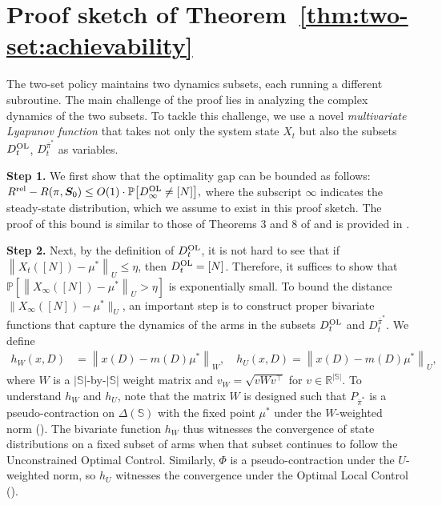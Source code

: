 \documentclass[11pt,letterpaper]{article}
\theoremstyle{plain}
\theoremstyle{definition}
\theoremstyle{remark}
\newcommand{\norm}[1]{\left\lVert#1\right\rVert}
\newcommand{\normplain}[1]{\lVert#1\rVert}
\newcommand{\Probbig}[1]{\mathbb{P}\big[#1\big]}
\newcommand{\Prob}[1]{\mathbb{P}\left[#1\right]}
\newcommand{\R}{\mathbb{R}}
\newcommand{\ve}[1]{\bm{#1}}
\newcommand{\veS}{\ve{S}}
\newcommand{\sspa}{\mathbb{S}}
\newcommand{\rel}{\textup{rel}} %
\newcommand{\ravg}{R}
\newcommand{\rsysn}{\ravg(\pi, \veS_0)}
\newcommand{\rrel}{\ravg^\rel}
\newcommand{\pibar}{{\sysbar{\pi}}}
\newcommand{\pibs}{{\pibar^*}}
\newcommand{\sysbar}[1]{\bar{#1}}
\newcommand{\simplex}{\Delta}
\newcommand{\statdist}{\mu^*}
\newcommand{\wmat}{W}
\newcommand{\umat}{U}
\newcommand{\hw}{h_\wmat}
\newcommand{\hu}{h_\umat}
\newcommand{\Da}{D^{\pibs}}
\newcommand{\Db}{D^{\textup{OL}}}
\begin{document}
\section{Proof sketch of Theorem~\ref{thm:two-set:achievability}}

The two-set policy maintains two dynamics subsets, each running a different subroutine. The main challenge of the proof lies in analyzing the complex dynamics of the two subsets. 
To tackle this challenge, we use a novel \emph{multivariate Lyapunov function} that takes not only the system state $X_t$ but also the subsets $\Db_t$, $\Da_t$ as variables.  



\textbf{Step 1.} We first show that the optimality gap can be bounded as follows:
$
    \rrel - \rsysn \leq O(1)\cdot \Probbig{\Db_\infty \neq [N]},
$
where the subscript $\infty$ indicates the steady-state distribution, which we assume to exist in this proof sketch. The proof of this bound is similar to those of Theorems 3 and 8 of \cite{GasGauYan_23_whittles} and is provided in . 

\textbf{Step 2.} Next, by the definition of $\Db_t$, it is not hard to see that if $\norm{X_t([N]) - \statdist}_\umat \leq \eta$, then $\Db_t = [N]$. Therefore, it suffices to show that $\Prob{\norm{X_\infty([N]) - \statdist}_\umat > \eta}$ is exponentially small. 
To bound the distance $\normplain{X_\infty([N]) - \statdist}_\umat$, an important step is to construct proper bivariate functions that capture the dynamics of the arms in the subsets $\Db_t$ and $\Da_t$. We define 
\begin{align*}    
    \hw(x, D) &= \norm{x(D) - m(D)\statdist}_\wmat, \quad
    \hu(x, D) = \norm{x(D) - m(D)\statdist}_\umat,
\end{align*}
where $\wmat$ is a $|\sspa|$-by-$|\sspa|$ weight matrix and ${v}_\wmat = \sqrt{v \wmat v^\top}$ for $v\in \R^{|\sspa|}$. 
To understand $\hw$ and $\hu$, note that the matrix $\wmat$ is designed such that $P_\pibs$ is a pseudo-contraction on $\simplex(\sspa)$ with the fixed point $\statdist$ under the $\wmat$-weighted norm (). The bivariate function $\hw$ thus witnesses the convergence of state distributions on a fixed subset of arms when that subset continues to follow the Unconstrained Optimal Control. Similarly, $\Phi$ is a pseudo-contraction under the $\umat$-weighted norm, so $\hu$ witnesses the convergence under the Optimal Local Control (). 
\end{document}
